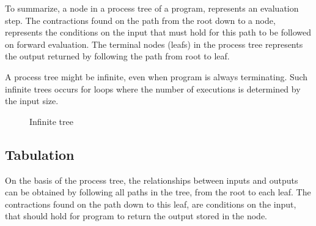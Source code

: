 \documentclass[10pt]{../sigplanconf}
\begin{document}
To summarize, a node in a process tree of a program, represents an
evaluation step. The contractions found on the path from the root down
to a node, represents the conditions on the input that must hold for
this path to be followed on forward evaluation. The terminal nodes
(leafs) in the process tree represents the output returned by
following the path from root to leaf.

A process tree might be infinite, even when program is always
terminating. Such infinite trees occurs for loops where the number of
executions is determined by the input size.

\begin{figure}
  \centering

  \caption{Infinite tree}
  \label{fig:inftree}
\end{figure}

\subsection{Tabulation}
On the basis of the process tree, the relationships between inputs and
outputs can be obtained by following all paths in the tree, from the
root to each leaf. The contractions found on the path down to this
leaf, are conditions on the input, that should hold for program to
return the output stored in the node.
\end{document}

